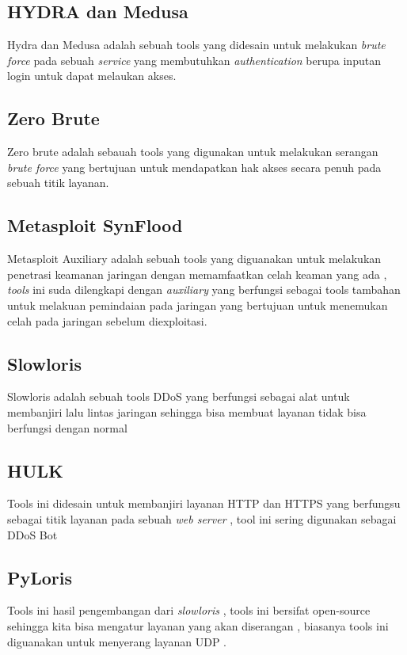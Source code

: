 \subsection{HYDRA dan Medusa}
Hydra dan Medusa adalah sebuah tools yang didesain untuk melakukan \emph{brute force} pada sebuah \emph{service} yang membutuhkan \emph{authentication} berupa inputan login untuk dapat melaukan akses.

\subsection{Zero Brute}
Zero brute adalah sebauah tools yang digunakan untuk melakukan serangan \emph{brute force} yang bertujuan untuk mendapatkan hak akses secara penuh pada sebuah titik layanan.

\subsection{Metasploit SynFlood}
Metasploit Auxiliary adalah sebuah tools yang diguanakan untuk melakukan penetrasi keamanan jaringan dengan memamfaatkan celah keaman yang ada , \emph{tools} ini suda dilengkapi dengan \emph{auxiliary} yang berfungsi sebagai tools tambahan untuk melakuan pemindaian pada jaringan yang bertujuan untuk menemukan celah pada jaringan sebelum diexploitasi.

\subsection{Slowloris}
Slowloris adalah sebuah tools DDoS yang berfungsi sebagai alat untuk membanjiri lalu lintas jaringan sehingga bisa membuat layanan tidak bisa berfungsi dengan normal 

\subsection{HULK}
Tools ini didesain untuk membanjiri layanan HTTP dan HTTPS yang berfungsu sebagai titik layanan pada sebuah \emph{web server} , tool ini sering digunakan sebagai DDoS Bot

\subsection{PyLoris}
Tools ini hasil pengembangan dari \emph{slowloris} , tools ini bersifat open-source sehingga kita bisa mengatur layanan yang akan diserangan , biasanya tools ini diguanakan untuk menyerang layanan UDP .

